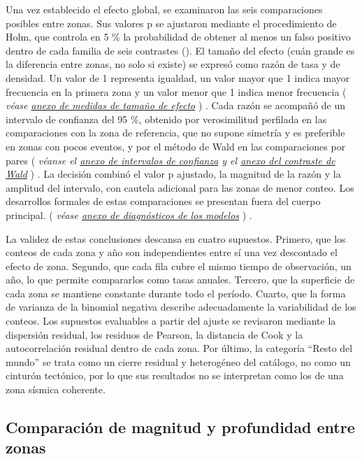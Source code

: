 \documentclass[
  spanish,
  letterpaper,
  DIV=11,
  numbers=noendperiod]{scrartcl}
\newcommand{\asesoriaParenRef}[1]{%
  \textnormal{\textcolor{asesoriaTextColor}{(}}%
  {\hypersetup{linkcolor=asesoriaLinkColor,urlcolor=asesoriaLinkColor,citecolor=asesoriaLinkColor}\textcolor{asesoriaTextColor}{\emph{#1}}}%
  \textnormal{\textcolor{asesoriaTextColor}{)}}%
}
\begin{document}
Una vez establecido el efecto global, se examinaron las seis
comparaciones posibles entre zonas. Sus valores p se ajustaron mediante
el procedimiento de Holm, que controla en 5 \% la probabilidad de
obtener al menos un falso positivo dentro de cada familia de seis
contrastes (). El tamaño del efecto
(cuán grande es la diferencia entre zonas, no solo si existe) se expresó
como razón de tasa y de densidad. Un valor de 1 representa igualdad, un
valor mayor que 1 indica mayor frecuencia en la primera zona y un valor
menor que 1 indica menor frecuencia
\asesoriaParenRef{véase \hyperref[sec-anexo-efecto]{anexo de medidas de tamaño de efecto}}.
Cada razón se acompañó de un intervalo de confianza del 95 \%, obtenido
por verosimilitud perfilada en las comparaciones con la zona de
referencia, que no supone simetría y es preferible en zonas con pocos
eventos, y por el método de Wald en las comparaciones por pares
\asesoriaParenRef{véanse el \hyperref[sec-anexo-ic]{anexo de intervalos de confianza} y el \hyperref[sec-anexo-wald]{anexo del contraste de Wald}}.
La decisión combinó el valor p ajustado, la magnitud de la razón y la
amplitud del intervalo, con cautela adicional para las zonas de menor
conteo. Los desarrollos formales de estas comparaciones se presentan
fuera del cuerpo principal.
\asesoriaParenRef{véase \hyperref[sec-anexo-diagnosticos]{anexo de diagnósticos de los modelos}}.

La validez de estas conclusiones descansa en cuatro supuestos. Primero,
que los conteos de cada zona y año son independientes entre sí una vez
descontado el efecto de zona. Segundo, que cada fila cubre el mismo
tiempo de observación, un año, lo que permite compararlos como tasas
anuales. Tercero, que la superficie de cada zona se mantiene constante
durante todo el período. Cuarto, que la forma de varianza de la binomial
negativa describe adecuadamente la variabilidad de los conteos. Los
supuestos evaluables a partir del ajuste se revisaron mediante la
dispersión residual, los residuos de Pearson, la distancia de Cook y la
autocorrelación residual dentro de cada zona. Por último, la categoría
``Resto del mundo'' se trata como un cierre residual y heterogéneo del
catálogo, no como un cinturón tectónico, por lo que sus resultados no se
interpretan como los de una zona sísmica coherente.

\subsection{Comparación de magnitud y profundidad entre
zonas}\label{sec-met-magnitud-profundidad}
\end{document}
